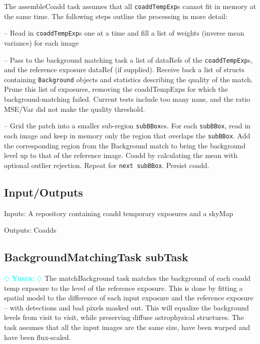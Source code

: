 \documentclass[12pt]{article}
\newcommand{\yusra} { \textcolor{cyan} {
\ensuremath{\diamondsuit} {\bf Yusra:}  
\ensuremath{\diamondsuit} } }
\begin{document}
The assembleCoadd task assumes that all {\tt coaddTempExp}s cannot fit in memory at the same time. The following steps outline the processing in more detail:

-- Read in {\tt coaddTempExp}s one at a time and fill a list of weights (inverse mean variance) for each image 

-- Pass to the background matching task a list of dataRefs of the {\tt coaddTempExp}s, and the reference exposure dataRef (if supplied).  Receive back a list of structs containing {\tt Background} objects and statistics describing the quality of the match.  Prune this list of exposures, removing the coaddTempExps for which the background-matching failed.  Current tests include too many nans, and the ratio MSE/Var did not make the quality threshold.

-- Grid the patch into a smaller sub-region {\tt subBBox}es. For each {\tt subBBox}, read in each image and keep in memory only the region that overlaps the {\tt subBBox}. Add the corresponding region from the Background match to bring the background level up to that of the reference image.  Coadd by calculating the mean with optional outlier rejection.  Repeat for {\tt next subBBox}.  Persist coadd. 



\subsection{Input/Outputs}

Inputs: A repository containing coadd temporary exposures and a skyMap

Outputs: Coadds

\subsection{BackgroundMatchingTask subTask} \yusra
The matchBackground task matches the background of each coadd temp exposure to the level of the reference exposure.   This is done by fitting a spatial model to the difference of each input exposure and the reference exposure -- with detections and bad pixels masked out.  This will equalize the background levels from visit to visit, while preserving diffuse astrophysical structures.  The task assumes that all the input images are the same size, have been warped and have been flux-scaled. 
\end{document}
